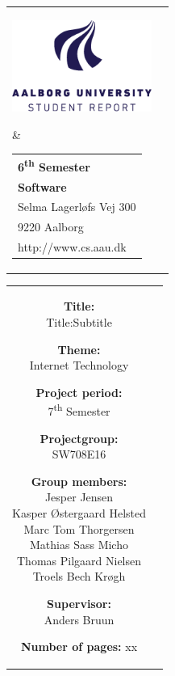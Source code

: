 \begin{titlepage}
	\setlength{\textwidth}{15cm}
	\noindent
	\begin{nopagebreak}
		{\samepage 
			\begin{tabular}{lr}
				\parbox{0.5\textwidth}{\raisebox{11mm}
					{\includegraphics[height=3cm]{img/aau-logo-english.png}}
				} &
				\parbox{0.4\textwidth}{
					\small
					\begin{tabular}{l}
						{\sf\small \textbf{6\textsuperscript{th} Semester}}\\
 						{\sf\small \textbf{Software}}\\
						{\sf\small Selma Lagerløfs Vej 300 } \\
						{\sf\small 9220 Aalborg} \\
						{\sf\small http://www.cs.aau.dk}
					\end{tabular}
				}
			\end{tabular}
			
			\noindent
			\begin{tabular}{cc}
				\parbox[t]{.45\textwidth}{
					\vspace{.15cm}
					\begin{description}
						\item {\bf Title:}\\
						Title:Subtitle
						\item {\bf Theme:}\\
						Internet Technology	
						\item {\bf Project period:}\\
							7\textsuperscript{th} Semester
			 				\hspace{4cm}
						\item {\bf Projectgroup:}\\
							SW708E16
			  				\hspace{4cm}
						\item {\bf Group members:}\\
						Jesper Jensen \\
						Kasper Østergaard Helsted \\
						Marc Tom Thorgersen \\
						Mathias Sass Micho \\
						Thomas Pilgaard Nielsen \\
						Troels Bech Krøgh
						\item {\bf Supervisor:}\\
							Anders Bruun
						\item {\bf Number of pages:} xx  
							

\end{description}}
\end{tabular}}
\end{nopagebreak}
\end{titlepage}
